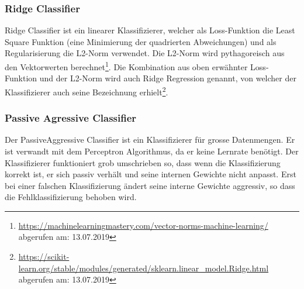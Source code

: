 \subsubsection{Ridge Classifier}
Ridge Classifier ist ein linearer Klassifizierer, welcher als Loss-Funktion die \glqq Least Square\grqq{} Funktion (eine Minimierung der quadrierten Abweichungen) und als Regularisierung die L2-Norm verwendet. Die L2-Norm wird pythagoreisch aus den Vektorwerten berechnet\footnote{\url{https://machinelearningmastery.com/vector-norms-machine-learning/} abgerufen am: 13.07.2019}.
Die Kombination aus oben erwähnter Loss-Funktion und der L2-Norm wird auch \glqq Ridge Regression\grqq{} genannt, von welcher der Klassifizierer auch seine Bezeichnung erhielt\footnote{\url{https://scikit-learn.org/stable/modules/generated/sklearn.linear_model.Ridge.html} abgerufen am: 13.07.2019}\cite{scikit-learn}.
\subsubsection{Passive Agressive Classifier}
Der PassiveAggressive Classifier ist ein Klassifizierer für grosse Datenmengen.
Er ist verwandt mit dem Perceptron Algorithmus, da er keine Lernrate benötigt.
Der Klassifizierer funktioniert grob umschrieben so, dass wenn die Klassifizierung korrekt ist, er sich passiv verhält und seine internen Gewichte nicht anpasst.
Erst bei einer falschen Klassifizierung ändert seine interne Gewichte aggressiv, so dass die Fehlklassifizierung behoben wird\cite{crammer2006online}.
